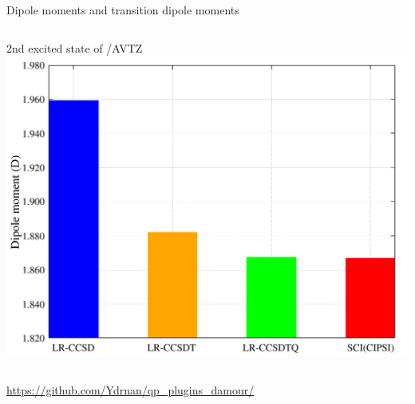 \documentclass[aspectratio=169,9pt]{beamer}
\begin{document}
\begin{frame}{Dipole moments and transition dipole moments}
\begin{columns}
                \begin{column}{0.5\textwidth}
                        \centering
                        \begin{block}{2nd excited state of /AVTZ}
			\includegraphics[width=1.0\textwidth]{fig/h2s_avtz.pdf}
                        \end{block}
                \end{column}

        \end{columns}

                        \bigskip
                        \centering
        \url{https://github.com/Ydrnan/qp_plugins_damour/}

\end{frame}
\end{document}
